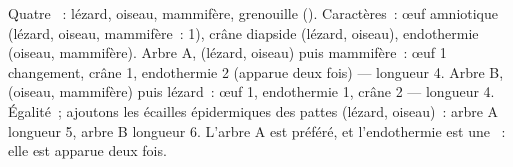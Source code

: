 \begin{example}\label{ex:b1:classifying-biodiversity:count}
Quatre ~: lézard, oiseau, mammifère, grenouille ().
Caractères~: œuf amniotique (lézard, oiseau, mammifère~: 1), crâne
diapside (lézard, oiseau), endothermie (oiseau, mammifère). Arbre A,
(lézard, oiseau) puis mammifère~: œuf 1 changement, crâne 1,
endothermie 2 (apparue deux fois) --- longueur 4. Arbre B, (oiseau,
mammifère) puis lézard~: œuf 1, endothermie 1, crâne 2 --- longueur 4.
Égalité~; ajoutons les écailles épidermiques des pattes (lézard,
oiseau)~: arbre A longueur 5, arbre B longueur 6. L'arbre A est
préféré, et l'endothermie est une ~: elle est apparue deux
fois.
\end{example}

